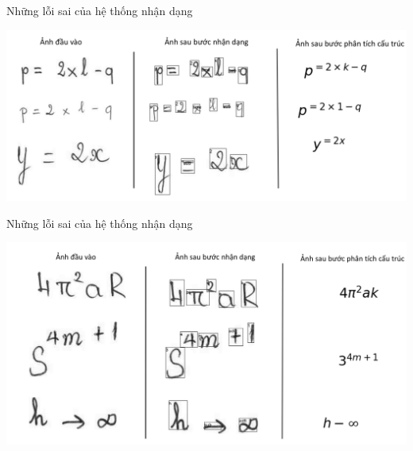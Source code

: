 \documentclass{beamer}
\begin{document}
	\begin{frame}{Những lỗi sai của hệ thống nhận dạng}
			\begin{center}
			\centering
			\includegraphics[width=0.775\linewidth]{phuluc_loi}
			\vspace{0.5cm}
		\end{center}
	\end{frame}
	
	\begin{frame}{Những lỗi sai của hệ thống nhận dạng}
	\begin{center}
		\centering
		\includegraphics[width=0.775\linewidth]{phuluc_sainhan}
		\vspace{0.5cm}
	\end{center}
\end{frame}
	
\end{document}
